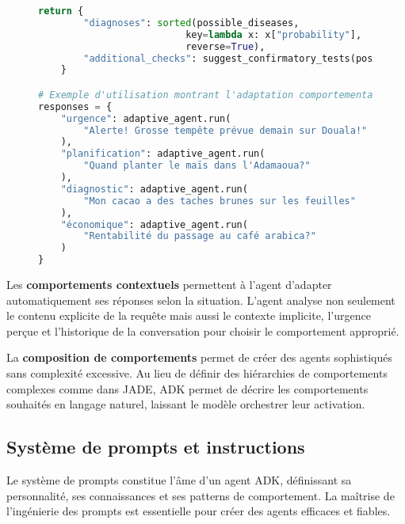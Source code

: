 \begin{figure}[H]
\begin{lstlisting}[language=Python, caption=Comportements adaptatifs avec ADK]
    return {
        "diagnoses": sorted(possible_diseases,
                          key=lambda x: x["probability"],
                          reverse=True),
        "additional_checks": suggest_confirmatory_tests(possible_diseases)
    }

# Exemple d'utilisation montrant l'adaptation comportementale
responses = {
    "urgence": adaptive_agent.run(
        "Alerte! Grosse tempête prévue demain sur Douala!"
    ),
    "planification": adaptive_agent.run(
        "Quand planter le maïs dans l'Adamaoua?"
    ),
    "diagnostic": adaptive_agent.run(
        "Mon cacao a des taches brunes sur les feuilles"
    ),
    "économique": adaptive_agent.run(
        "Rentabilité du passage au café arabica?"
    )
}
\end{lstlisting}
\end{figure}

Les \textbf{comportements contextuels} permettent à l'agent d'adapter automatiquement ses réponses selon la situation. L'agent analyse non seulement le contenu explicite de la requête mais aussi le contexte implicite, l'urgence perçue et l'historique de la conversation pour choisir le comportement approprié.

La \textbf{composition de comportements} permet de créer des agents sophistiqués sans complexité excessive. Au lieu de définir des hiérarchies de comportements complexes comme dans JADE, ADK permet de décrire les comportements souhaités en langage naturel, laissant le modèle orchestrer leur activation.

\subsection{Système de prompts et instructions}

Le système de prompts constitue l'âme d'un agent ADK, définissant sa personnalité, ses connaissances et ses patterns de comportement. La maîtrise de l'ingénierie des prompts est essentielle pour créer des agents efficaces et fiables.

